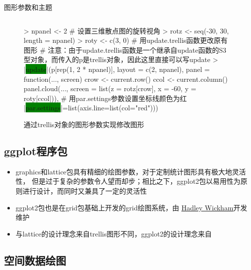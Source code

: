\begin{frame}[t,fragile]{\subsecname}{图形参数和主题}
\begin{overlayarea}{\textwidth}{\textheight}
\begin{onlyenv}
\begin{figure}
\begin{columns}
    \begin{column}[c]{.6\textwidth}
\begin{rcode}
> npanel <- 2
# 设置三维散点图的旋转视角
> rotz <- seq(-30, 30, length = npanel)
> roty <- c(3, 0)
# 用update.trellis函数更改原有图形
# 注意：由于update.trellis函数是一个继承自update函数的S3型对象，而传入的p是trellis对象，因此这里直接可以写update
> |\colorbox{green}{update}|(p[rep(1, 2 * npanel)], 
         layout = c(2, npanel),
         panel = function(..., screen) {
           crow <- current.row()
           ccol <- current.column()
         panel.cloud(..., screen = list(z = rotz[crow], x = -60, y = roty[ccol]))},
         # 用par.settings参数设置坐标线颜色为红 
         |\colorbox{green}{par.settings}|=list(axis.line=list(col="red")))
\end{rcode}
    \end{column}
  \end{columns}
  \caption{通过trellis对象的图形参数实现修改图形}
\end{figure}
\end{onlyenv}
\end{overlayarea}
\end{frame}

\subsection{ggplot程序包}
\begin{frame}{\subsecname}{}
\begin{itemize}
\item graphics和lattice包具有精细的绘图参数，对于定制统计图形具有极大地灵活性，
但是过于复杂的参数令人望而却步；相比之下，ggplot2包以易用性为原则进行设计，而同时又兼具了一定的灵活性
\item ggplot2包也是在grid包基础上开发的grid绘图系统，由
\href{http://hadley.nz/}{\uline{Hadley Wickham}}开发维护
\item 与lattice的设计理念来自trellis图形不同，ggplot2的设计理念来自
\end{itemize}
\end{frame}

\subsection{空间数据绘图}
